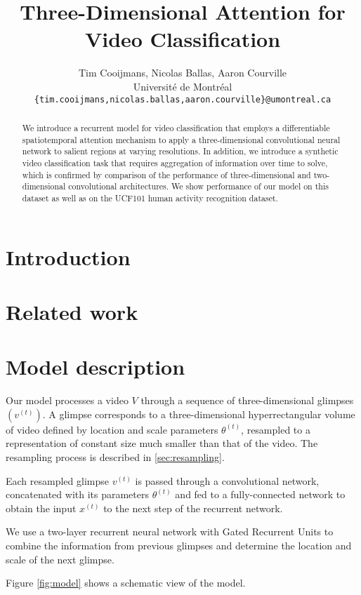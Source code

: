 \documentclass{article} %
\title{Three-Dimensional Attention for Video Classification}
\author{
Tim Cooijmans, Nicolas Ballas, Aaron Courville \\
Universit\'e de Montr\'eal \\
\texttt{\{tim.cooijmans,nicolas.ballas,aaron.courville\}@umontreal.ca}
}
\begin{document}
\maketitle

\begin{abstract}
We introduce a recurrent model for video classification that employs a differentiable spatiotemporal attention mechanism to apply a three-dimensional convolutional neural network to salient regions at varying resolutions. In addition, we introduce a synthetic video classification task that requires aggregation of information over time to solve, which is confirmed by comparison of the performance of three-dimensional and two-dimensional convolutional architectures. We show performance of our model on this dataset as well as on the UCF101 human activity recognition dataset.
\end{abstract}

\section{Introduction}

\section{Related work}

\section{Model description}

Our model processes a video $V$ through a sequence of three-dimensional glimpses $\left(v^{(t)}\right)$.
A glimpse corresponds to a three-dimensional hyperrectangular volume of video defined by location and scale parameters $\theta^{(t)}$, resampled to a representation of constant size much smaller than that of the video.
The resampling process is described in \ref{sec:resampling}.

Each resampled glimpse $v^{(t)}$ is passed through a convolutional network, concatenated with its parameters $\theta^{(t)}$ and fed to a fully-connected network to obtain the input $x^{(t)}$ to the next step of the recurrent network.

We use a two-layer recurrent neural network with Gated Recurrent Units\cite{Cho2014} to combine the information from previous glimpses and determine the location and scale of the next glimpse.

Figure \ref{fig:model} shows a schematic view of the model.
\end{document}
